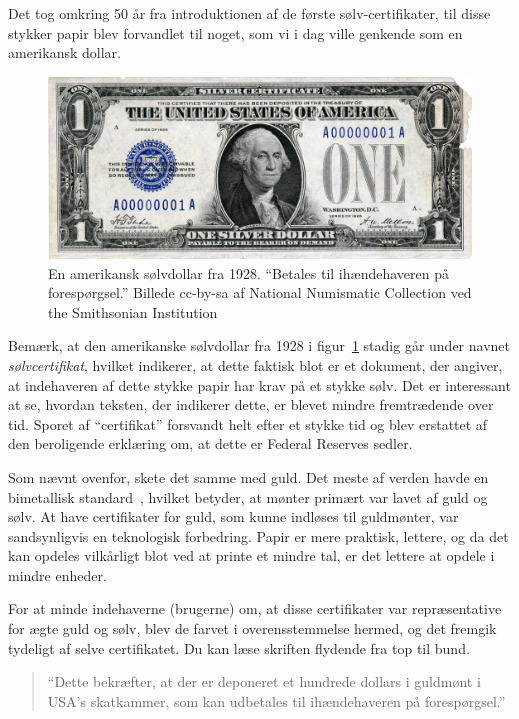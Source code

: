 \documentclass[paper=6in:9in,pagesize=pdftex,headinclude=on,footinclude=on,12pt]{scrbook}
\begin{document}
Det tog omkring 50 år fra introduktionen af de første sølv-certifikater, til disse stykker papir blev forvandlet til noget, som vi i dag ville genkende som en amerikansk dollar.\begin{figure}
  \centering
  \includegraphics{assets/images/us-silver-dollar-note-smaller.png}
  \caption{En amerikansk sølvdollar fra 1928. \enquote{Betales til ihændehaveren på forespørgsel.} Billede cc-by-sa af National Numismatic Collection ved the Smithsonian Institution}
  \label{fig:us-silver-dollar-note-smaller}
\end{figure}

Bemærk, at den amerikanske sølvdollar fra 1928 i figur~\ref{fig:us-silver-dollar-note-smaller} stadig går under navnet \textit{sølvcertifikat}, hvilket indikerer, at dette faktisk blot er et dokument, der angiver, at indehaveren af dette stykke papir har krav på et stykke sølv. Det er interessant at se, hvordan teksten, der indikerer dette, er blevet mindre fremtrædende over tid. Sporet af \enquote{certifikat} forsvandt helt efter et stykke tid og blev erstattet af den beroligende erklæring om, at dette er Federal Reserves sedler.

Som nævnt ovenfor, skete det samme med guld. Det meste af verden havde en bimetallisk standard~\cite{wiki:bimetallism}, hvilket betyder, at mønter primært var lavet af guld og sølv. At have certifikater for guld, som kunne indløses til guldmønter, var sandsynligvis en teknologisk forbedring. Papir er mere praktisk, lettere, og da det kan opdeles vilkårligt blot ved at printe et mindre tal, er det lettere at opdele i mindre enheder.

For at minde indehaverne (brugerne) om, at disse certifikater var repræsentative for ægte guld og sølv, blev de farvet i overensstemmelse hermed, og det fremgik tydeligt af selve certifikatet. Du kan læse skriften flydende fra top til bund.\begin{quotation}\begin{samepage} \enquote{Dette bekræfter, at der er deponeret et hundrede dollars i guldmønt i USA's skatkammer, som kan udbetales til ihændehaveren på forespørgsel.} \end{samepage}\end{quotation}
\end{document}
